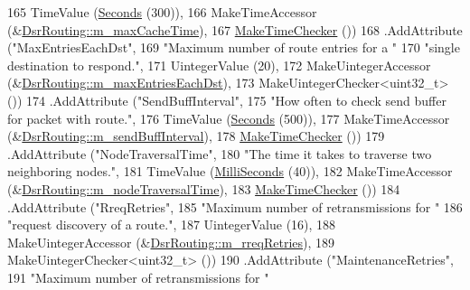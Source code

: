 \begin{DoxyCode}
165                    TimeValue (\hyperlink{group__timecivil_ga33c34b816f8ff6628e33d5c8e9713b9e}{Seconds} (300)),
166                    MakeTimeAccessor (&\hyperlink{classns3_1_1dsr_1_1DsrRouting_a76d8abfedbda7429e983c407748400be}{DsrRouting::m\_maxCacheTime}),
167                    \hyperlink{group__time_ga7032965bd4afa578691d88c09e4481c1}{MakeTimeChecker} ())
168     .AddAttribute (\textcolor{stringliteral}{"MaxEntriesEachDst"},
169                    \textcolor{stringliteral}{"Maximum number of route entries for a "}
170                    \textcolor{stringliteral}{"single destination to respond."},
171                    UintegerValue (20),
172                    MakeUintegerAccessor (&\hyperlink{classns3_1_1dsr_1_1DsrRouting_a470ec4bd470cd1d802621752331d9916}{DsrRouting::m\_maxEntriesEachDst}),
173                    MakeUintegerChecker<uint32\_t> ())
174     .AddAttribute (\textcolor{stringliteral}{"SendBuffInterval"},
175                    \textcolor{stringliteral}{"How often to check send buffer for packet with route."},
176                    TimeValue (\hyperlink{group__timecivil_ga33c34b816f8ff6628e33d5c8e9713b9e}{Seconds} (500)),
177                    MakeTimeAccessor (&\hyperlink{classns3_1_1dsr_1_1DsrRouting_a966d7c644a941e3e6365859983816e8b}{DsrRouting::m\_sendBuffInterval}),
178                    \hyperlink{group__time_ga7032965bd4afa578691d88c09e4481c1}{MakeTimeChecker} ())
179     .AddAttribute (\textcolor{stringliteral}{"NodeTraversalTime"},
180                    \textcolor{stringliteral}{"The time it takes to traverse two neighboring nodes."},
181                    TimeValue (\hyperlink{group__timecivil_gaf26127cf4571146b83a92ee18679c7a9}{MilliSeconds} (40)),
182                    MakeTimeAccessor (&\hyperlink{classns3_1_1dsr_1_1DsrRouting_a4c406057009653878e8cdf3e3a7f2106}{DsrRouting::m\_nodeTraversalTime}),
183                    \hyperlink{group__time_ga7032965bd4afa578691d88c09e4481c1}{MakeTimeChecker} ())
184     .AddAttribute (\textcolor{stringliteral}{"RreqRetries"},
185                    \textcolor{stringliteral}{"Maximum number of retransmissions for "}
186                    \textcolor{stringliteral}{"request discovery of a route."},
187                    UintegerValue (16),
188                    MakeUintegerAccessor (&\hyperlink{classns3_1_1dsr_1_1DsrRouting_a88bbff666cd3bb5bad099587a967d547}{DsrRouting::m\_rreqRetries}),
189                    MakeUintegerChecker<uint32\_t> ())
190     .AddAttribute (\textcolor{stringliteral}{"MaintenanceRetries"},
191                    \textcolor{stringliteral}{"Maximum number of retransmissions for "}

\end{DoxyCode}
